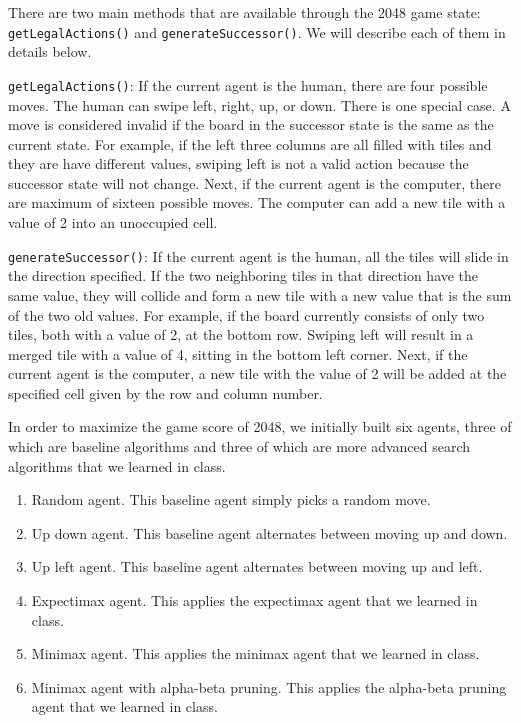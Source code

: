 \documentclass[9pt,twocolumn]{article}
\begin{document}
There are two main methods that are available through the 2048 game state: \texttt{getLegalActions()} and \texttt{generateSuccessor()}. We will describe each of them in details below.

\texttt{getLegalActions()}: If the current agent is the human, there are four possible moves. The human can swipe left, right, up, or down. There is one special case. A move is considered invalid if the board in the successor state is the same as the current state. For example, if the left three columns are all filled with tiles and they are have different values, swiping left is not a valid action because the successor state will not change. Next, if the current agent is the computer, there are maximum of sixteen possible moves. The computer can add a new tile with a value of 2 into an unoccupied cell.

\texttt{generateSuccessor()}: If the current agent is the human, all the tiles will slide in the direction specified. If the two neighboring tiles in that direction have the same value, they will collide and form a new tile with a new value that is the sum of the two old values. For example, if the board currently consists of only two tiles, both with a value of 2, at the bottom row. Swiping left will result in a merged tile with a value of 4, sitting in the bottom left corner. Next, if the current agent is the computer, a new tile with the value of 2 will be added at the specified cell given by the row and column number.

In order to maximize the game score of 2048, we initially built six agents, three of which are baseline algorithms and three of which are more advanced search algorithms that we learned in class.

\begin{enumerate}[1)]

\item Random agent. This baseline agent simply picks a random move.

\item Up down agent. This baseline agent alternates between moving up and down.

\item Up left agent. This baseline agent alternates between moving up and left.

\item Expectimax agent. This applies the expectimax agent that we learned in class.

\item Minimax agent. This applies the minimax agent that we learned in class.

\item Minimax agent with alpha-beta pruning. This applies the alpha-beta pruning agent that we learned in class.

\end{enumerate}
\end{document}
